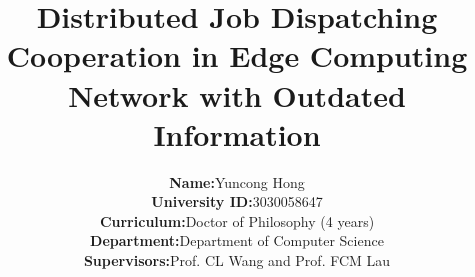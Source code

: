 \documentclass[journal, 12pt, onecolumn, draftclsnofoot]{IEEEtran} %
\theoremstyle{definition}             %
\theoremstyle{remark}                 %
\theoremstyle{plain}                  %
\begin{document}
    \title{
        Distributed Job Dispatching Cooperation in Edge Computing Network with Outdated Information
    }

    \author{
        \begin{tabular}{rl}
            \textbf{Name: }&                Yuncong Hong \\
            \textbf{University ID:}&        3030058647 \\
            \textbf{Curriculum:}&           Doctor of Philosophy (4 years) \\
            \textbf{Department:}&           Department of Computer Science \\
            \textbf{Supervisors:}&          Prof. CL Wang and Prof. FCM Lau 
        \end{tabular}
    }

    \maketitle
    {
        \fancyhf{}
    }
    \thispagestyle{firststyle}
    

    
    

    
    

    
    
    
    

    
    

\end{document}
